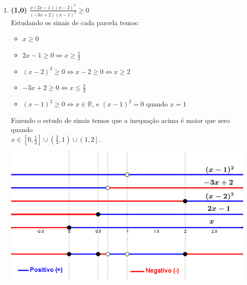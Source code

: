 \documentclass[a4paper,12pt]{article}
\newcommand{\RR}{\mathbb{R}}
\newcommand{\ds}{\displaystyle}
\begin{document}
\begin{enumerate}
\begin{enumerate}
 \item {\bf (1,0)} $\ds \frac{x(2x-1)(x-2)^3}{(-3x+2)(x-1)^2}\geq 0  $\\
 \vspace{3mm}
 Estudando os sinais de cada parcela temos:
  \begin{itemize}
   \item $x\geq0$\\
   \item $2x-1 \geq 0 \Leftrightarrow x\geq\frac{1}{2}$\\
   \item $(x-2)^3 \geq 0 \Leftrightarrow x-2\geq0 \Leftrightarrow x\geq2$\\
   \item $-3x+2 \geq 0 \Leftrightarrow x\leq\frac{2}{3}$\\
   \item $(x-1)^2 \geq 0 \Leftrightarrow x\in \RR \mbox{, e } (x-1)^2 = 0 \mbox{ quando } x = 1$\\
  \end{itemize}
 Fazendo o estudo de sinais temos que a inequação acima é maior que zero quando\\ $x\in\left[0,\frac{1}{2}\right]\cup\left(\frac{2}{3},1\right)\cup\left(1, 2\right]$.\\
 \begin{center}
 \includegraphics[scale=2]{Q1b.png}
 \end{center}



\end{enumerate}
\end{enumerate}
\end{document}
